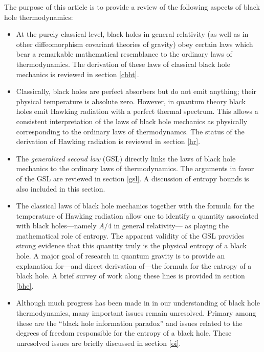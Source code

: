 \documentclass[12pt]{article}
\begin{document}
The purpose of this article is to provide a review of the following
aspects of black hole thermodynamics:

\begin{itemize}
\item At the purely classical level, black holes in general relativity
(as well as in other diffeomorphism covariant theories of gravity)
obey certain laws which bear a remarkable mathematical resemblance to
the ordinary laws of thermodynamics. The derivation of these laws of
classical black hole mechanics is reviewed in section \ref{cbht}.

\item Classically, black holes are perfect absorbers but do not emit
anything; their physical temperature is absolute zero. However, in
quantum theory black holes emit Hawking radiation with a perfect
thermal spectrum. This allows a consistent interpretation of the laws of
black hole mechanics as physically corresponding to the ordinary laws
of thermodynamcs. The status of the derivation of Hawking radiation
is reviewed in section \ref{hr}.

\item The {\it generalized second law} (GSL) directly links the laws
of black hole mechanics to the ordinary laws of thermodynamics. The
arguments in favor of the GSL are reviewed in section \ref{gsl}. A
discussion of entropy bounds is also included in this section.

\item The classical laws of black hole mechanics together with the
formula for the temperature of Hawking radiation allow one to identify
a quantity associated with black holes---namely $A/4$ in general
relativity--- as playing the mathematical role of entropy. The apparent
validity of the GSL provides strong evidence that this quantity truly
is the physical entropy of a black hole. A major goal of research in
quantum gravity is to provide an explanation for---and direct
derivation of---the formula for the entropy of a black hole. A brief
survey of work along these lines is provided in section \ref{bhe}.

\item Although much progress has been made in in our understanding of
black hole thermodynamics, many important issues remain
unresolved. Primary among these are the ``black hole information
paradox'' and issues related to the degrees of freedom responsible for
the entropy of a black hole. These unresolved issues are
briefly discussed in section \ref{oi}.

\end{itemize}
\end{document}

